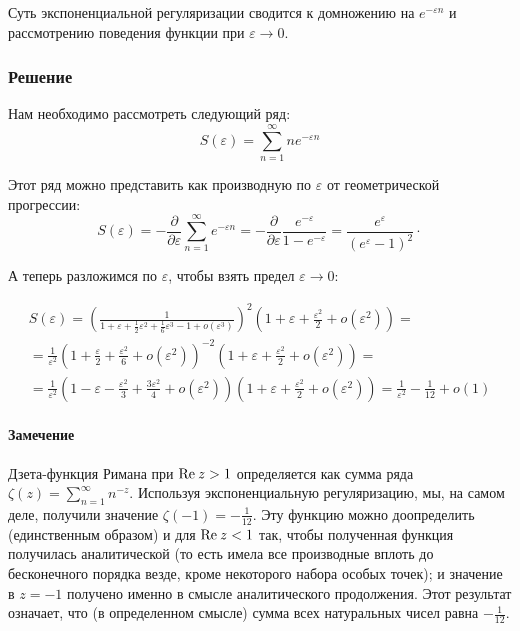 \documentclass[a4paper,12pt]{article}
\begin{document}
Суть экспоненциальной регуляризации сводится к домножению на $e^{-\varepsilon n}$
и рассмотрению поведения функции при $\varepsilon\to0$.


\subsubsection*{Решение}

Нам необходимо рассмотреть следующий ряд:
\[
S(\varepsilon)=\sum_{n=1}^{\infty}ne^{-\varepsilon n}
\]

\noindent
Этот ряд можно представить как производную по $\varepsilon$ от геометрической
прогрессии:
\[
S(\varepsilon)=-\frac{\partial}{\partial\varepsilon}\sum_{n=1}^{\infty}e^{-\varepsilon n}=-\frac{\partial}{\partial\varepsilon}\frac{e^{-\varepsilon}}{1-e^{-\varepsilon}}=\frac{e^{\varepsilon}}{(e^{\varepsilon}-1)^{2}}\cdot
\]

\noindent
А теперь разложимся по $\varepsilon$, чтобы взять предел $\varepsilon\to0$:

\begin{multline*}
S\left(\varepsilon\right)=\left(\frac{1}{1+\varepsilon+\frac{1}{2}\varepsilon^{2}+\frac{1}{6}\varepsilon^{3}-1+o(\varepsilon^{3})}\right)^{2}\left(1+\varepsilon+\frac{\varepsilon^{2}}{2}+o(\varepsilon^{2})\right)=\\
=\frac{1}{\varepsilon^{2}}\left(1+\frac{\varepsilon}{2}+\frac{\varepsilon^{2}}{6}+o(\varepsilon^{2})\right)^{-2}\left(1+\varepsilon+\frac{\varepsilon^{2}}{2}+o(\varepsilon^{2})\right)=\\
=\frac{1}{\varepsilon^{2}}\left(1-\varepsilon-\frac{\varepsilon^{2}}{3}+\frac{3\varepsilon^{2}}{4}+o(\varepsilon^{2})\right)\left(1+\varepsilon+\frac{\varepsilon^{2}}{2}+o(\varepsilon^{2})\right)=\frac{1}{\varepsilon^{2}}-\frac{1}{12}+o(1)
\end{multline*}



\paragraph{Замечение}

Дзета-функция Римана при ${\rm Re}\:z>1$ определяется как сумма ряда
$\zeta(z)=\sum_{n=1}^{\infty}n^{-z}$. Используя экспоненциальную
регуляризацию, мы, на самом деле, получили значение $\zeta(-1)=-\frac{1}{12}$.
Эту функцию можно доопределить (единственным образом) и для ${\rm Re}\:z<1$
так, чтобы полученная функция получилась аналитической (то есть имела
все производные вплоть до бесконечного порядка везде, кроме некоторого
набора особых точек); и значение в $z=-1$ получено именно в смысле
аналитического продолжения. Этот результат означает, что (в определенном
смысле) сумма всех натуральных чисел равна $-\frac{1}{12}$.
\end{document}
